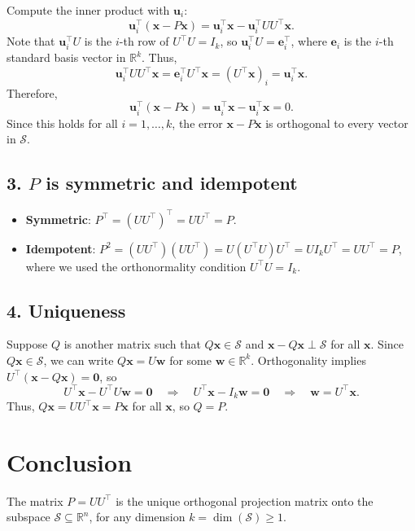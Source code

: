 \documentclass{article}
\begin{document}
Compute the inner product with $ \mathbf{u}_i $:
\[
\mathbf{u}_i^\top (\mathbf{x} - P\mathbf{x}) = \mathbf{u}_i^\top \mathbf{x} - \mathbf{u}_i^\top U U^\top \mathbf{x}.
\]
Note that $ \mathbf{u}_i^\top U $ is the $ i $-th row of $ U^\top U = I_k $, so $ \mathbf{u}_i^\top U = \mathbf{e}_i^\top $, where $ \mathbf{e}_i $ is the $ i $-th standard basis vector in $ \mathbb{R}^k $. Thus,
\[
\mathbf{u}_i^\top U U^\top \mathbf{x} = \mathbf{e}_i^\top U^\top \mathbf{x} = (U^\top \mathbf{x})_i = \mathbf{u}_i^\top \mathbf{x}.
\]
Therefore,
\[
\mathbf{u}_i^\top (\mathbf{x} - P\mathbf{x}) = \mathbf{u}_i^\top \mathbf{x} - \mathbf{u}_i^\top \mathbf{x} = 0.
\]
Since this holds for all $ i = 1, \dots, k $, the error $ \mathbf{x} - P\mathbf{x} $ is orthogonal to every vector in $ \mathcal{S} $.

\subsection*{3. $ P $ is symmetric and idempotent}


\begin{itemize}
\item \textbf{Symmetric}: $ P^\top = (U U^\top)^\top = U U^\top = P $.
    \item \textbf{Idempotent}: $ P^2 = (U U^\top)(U U^\top) = U (U^\top U) U^\top = U I_k U^\top = U U^\top = P $,
    where we used the orthonormality condition $ U^\top U = I_k $.
\end{itemize}


\subsection*{4. Uniqueness}

Suppose $ Q $ is another matrix such that $ Q\mathbf{x} \in \mathcal{S} $ and $ \mathbf{x} - Q\mathbf{x} \perp \mathcal{S} $ for all $ \mathbf{x} $.  
Since $ Q\mathbf{x} \in \mathcal{S} $, we can write $ Q\mathbf{x} = U \mathbf{w} $ for some $ \mathbf{w} \in \mathbb{R}^k $.  
Orthogonality implies $ U^\top (\mathbf{x} - Q\mathbf{x}) = \mathbf{0} $, so
\[
U^\top \mathbf{x} - U^\top U \mathbf{w} = \mathbf{0} \quad \Rightarrow \quad U^\top \mathbf{x} - I_k \mathbf{w} = \mathbf{0} \quad \Rightarrow \quad \mathbf{w} = U^\top \mathbf{x}.
\]
Thus, $ Q\mathbf{x} = U U^\top \mathbf{x} = P\mathbf{x} $ for all $ \mathbf{x} $, so $ Q = P $.

\section*{Conclusion}

The matrix $ P = U U^\top $ is the unique orthogonal projection matrix onto the subspace $ \mathcal{S} \subseteq \mathbb{R}^n $, for any dimension $ k = \dim(\mathcal{S}) \geq 1 $.
\end{document}
